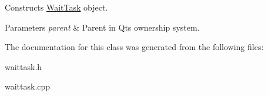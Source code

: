 Constructs \hyperlink{class_wait_task}{Wait\+Task} object. 


\begin{DoxyParams}{Parameters}
{\em parent} & Parent in Qt\textquotesingle{}s ownership system. \\
\hline
\end{DoxyParams}


The documentation for this class was generated from the following files\+:\begin{DoxyCompactItemize}
\item 
waittask.\+h\item 
waittask.\+cpp\end{DoxyCompactItemize}
